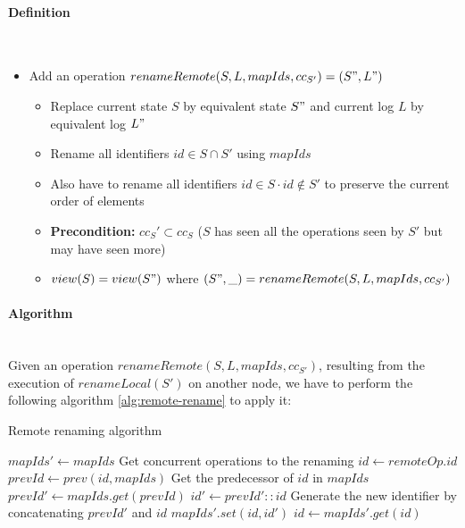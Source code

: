 \documentclass[a4paper]{article}
\begin{document}
\paragraph{Definition}~\\

\begin{itemize}
  \item Add an operation $renameRemote(S, L, mapIds, cc_{S'}) = (S", L")$
  \begin{itemize}
    \item Replace current state $S$ by equivalent state $S"$ and current log $L$ by equivalent log $L"$
    \item Rename all identifiers $id \in S \cap S'$ using $mapIds$
    \item Also have to rename all identifiers $id \in S \cdot id \notin S'$ to preserve the current order of elements
    \item \textbf{Precondition: } $cc_S' \subset cc_S$ ($S$ has seen all the operations seen by $S'$ but may have seen more)
    \item $view(S) = view(S")$ where $(S", \_) = renameRemote(S, L, mapIds, cc_{S'})$
  \end{itemize}
\end{itemize}

\paragraph{Algorithm}~\\

Given an operation $renameRemote(S, L, mapIds, cc_{S'})$,
resulting from the execution of $renameLocal(S')$ on another node,
we have to perform the following algorithm \ref{alg:remote-rename} to apply it:

\begin{algorithm}
  \caption{Remote renaming algorithm}
  \label{alg:remote-rename}
  \begin{algorithmic}
      \State $mapIds' \gets mapIds$
      \Comment Get concurrent operations to the renaming
        \State $id \gets remoteOp.id$
          \State $prevId \gets prev(id, mapIds)$
          \Comment Get the predecessor of $id$ in $mapIds$
          \State $prevId' \gets mapIds.get(prevId)$
          \State $id' \gets prevId' :: id$
          \Comment Generate the new identifier by concatenating $prevId'$ and $id$
          \State $mapIds'.set(id, id')$
        \EndIf
      \EndFor
        \State $id \gets mapIds'.get(id)$
      \EndFor
    \EndProcedure
  \end{algorithmic}
\end{algorithm}
\end{document}
